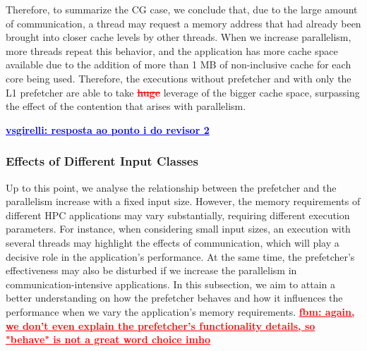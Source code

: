 \documentclass[AMA,final,STIX1COL]{WileyNJD-v2}
\newcommand{\vsg}[1]{\textcolor{blue}{\bfseries \ul{vsgirelli: #1} }\vspace{0.2cm}}
\newcommand{\fbm}[1]{\textcolor{red}{\bfseries \ul{fbm: #1} }\vspace{0.2cm}}
\begin{document}


Therefore, to summarize the CG case, we
conclude that, due to the large amount of communication, a thread may request a memory address that had already been brought into closer cache levels by other threads.
When we increase parallelism, more threads repeat this behavior, and the application has more cache space available due to the addition of more than 1 MB of non-inclusive cache for each core being used.
Therefore, the executions without prefetcher and with only the L1 prefetcher are able to take \textcolor{red}{\textbf{\sout{huge}}} leverage of the bigger cache space, surpassing the effect of the contention that arises with parallelism.




\vsg{resposta ao ponto i do revisor 2}
\subsubsection{Effects of Different Input Classes}
\label{subs:NAS_WAB}

Up to this point, we analyse the relationship between the prefetcher and the parallelism increase with a fixed input size.
However, the memory requirements of different HPC applications may vary substantially, requiring different execution parameters. %
For instance, when considering small input sizes, an execution with several threads may highlight the effects of communication, which will play a decisive role in the application's performance.
At the same time, the prefetcher's effectiveness may also be disturbed if we increase the parallelism in communication-intensive applications.
In this subsection, we aim to attain a better understanding on how the prefetcher behaves and how it influences the performance when we vary the application's memory requirements. \fbm{again, we don't even explain the prefetcher's functionality details, so "behave" is not a great word choice imho}
\end{document}
